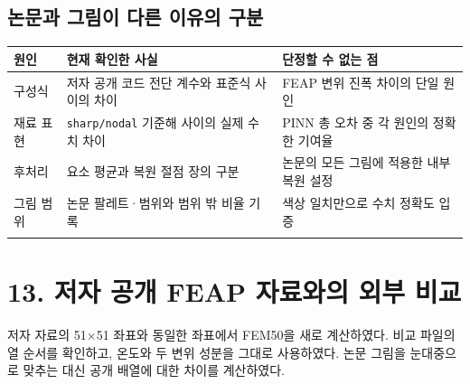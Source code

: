 \documentclass[10pt,a4paper]{article}
\begin{document}
\subsection{논문과 그림이 다른 이유의 구분}

\begingroup\small

\par\begin{minipage}{\linewidth}\begin{tabular}{>{\raggedright\arraybackslash}p{}>{\raggedright\arraybackslash}p{}>{\raggedright\arraybackslash}p{}}

\rowcolor{tint} \textbf{원인} & \textbf{현재 확인한 사실} & \textbf{단정할 수 없는 점}\\\midrule

구성식 & 저자 공개 코드 전단 계수와 표준식 사이의 차이 & FEAP 변위 진폭 차이의 단일 원인\\\addlinespace[2pt]

재료 표현 & \nolinkurl{sharp/nodal} 기준해 사이의 실제 수치 차이 & PINN 총 오차 중 각 원인의 정확한 기여율\\\addlinespace[2pt]

후처리 & 요소 평균과 복원 절점 장의 구분 & 논문의 모든 그림에 적용한 내부 복원 설정\\\addlinespace[2pt]

그림 범위 & 논문 팔레트·범위와 범위 밖 비율 기록 & 색상 일치만으로 수치 정확도 입증\\\addlinespace[2pt]

\bottomrule\end{tabular}\end{minipage}\par\vspace{5pt}\endgroup

\clearpage

\section{13. 저자 공개 FEAP 자료와의 외부 비교}

저자 자료의 51$\times$51 좌표와 동일한 좌표에서 FEM50을 새로 계산하였다. 비교 파일의 열 순서를 확인하고, 온도와 두 변위 성분을 그대로 사용하였다. 논문 그림을 눈대중으로 맞추는 대신 공개 배열에 대한 차이를 계산하였다.\par
\end{document}
